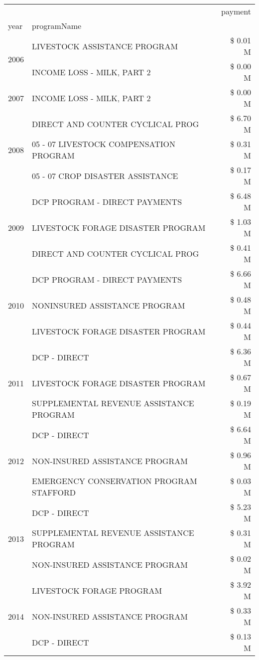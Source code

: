 \begin{tabular}{llr}
\toprule
 &  & payment \\
year & programName &  \\
\midrule
\multirow[t]{2}{*}{2006} & LIVESTOCK ASSISTANCE PROGRAM & \$ 0.01 M \\
 & INCOME LOSS - MILK, PART 2 & \$ 0.00 M \\
\cline{1-3}
2007 & INCOME LOSS - MILK, PART 2 & \$ 0.00 M \\
\cline{1-3}
\multirow[t]{3}{*}{2008} & DIRECT AND COUNTER CYCLICAL PROG & \$ 6.70 M \\
 & 05 - 07 LIVESTOCK COMPENSATION PROGRAM & \$ 0.31 M \\
 & 05 - 07 CROP DISASTER ASSISTANCE & \$ 0.17 M \\
\cline{1-3}
\multirow[t]{3}{*}{2009} & DCP PROGRAM - DIRECT PAYMENTS & \$ 6.48 M \\
 & LIVESTOCK FORAGE DISASTER  PROGRAM & \$ 1.03 M \\
 & DIRECT AND COUNTER CYCLICAL PROG & \$ 0.41 M \\
\cline{1-3}
\multirow[t]{3}{*}{2010} & DCP PROGRAM - DIRECT PAYMENTS & \$ 6.66 M \\
 & NONINSURED ASSISTANCE PROGRAM & \$ 0.48 M \\
 & LIVESTOCK FORAGE DISASTER  PROGRAM & \$ 0.44 M \\
\cline{1-3}
\multirow[t]{3}{*}{2011} & DCP - DIRECT & \$ 6.36 M \\
 & LIVESTOCK FORAGE DISASTER PROGRAM & \$ 0.67 M \\
 & SUPPLEMENTAL REVENUE ASSISTANCE PROGRAM & \$ 0.19 M \\
\cline{1-3}
\multirow[t]{3}{*}{2012} & DCP - DIRECT & \$ 6.64 M \\
 & NON-INSURED ASSISTANCE PROGRAM & \$ 0.96 M \\
 & EMERGENCY CONSERVATION PROGRAM STAFFORD & \$ 0.03 M \\
\cline{1-3}
\multirow[t]{3}{*}{2013} & DCP - DIRECT & \$ 5.23 M \\
 & SUPPLEMENTAL REVENUE ASSISTANCE PROGRAM & \$ 0.31 M \\
 & NON-INSURED ASSISTANCE PROGRAM & \$ 0.02 M \\
\cline{1-3}
\multirow[t]{3}{*}{2014} & LIVESTOCK FORAGE PROGRAM & \$ 3.92 M \\
 & NON-INSURED ASSISTANCE PROGRAM & \$ 0.33 M \\
 & DCP - DIRECT & \$ 0.13 M \\
\cline{1-3}

\end{tabular}
